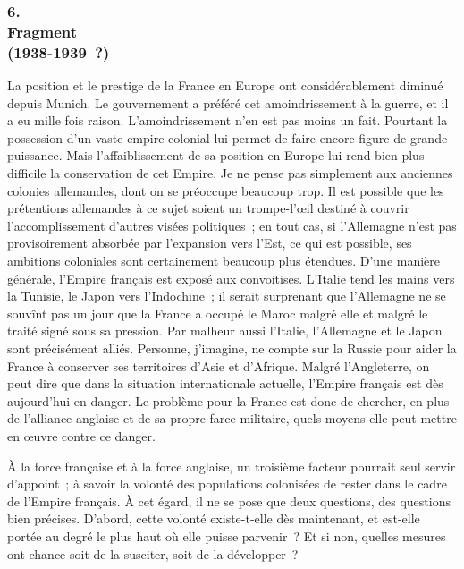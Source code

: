 \documentclass[french,twoside]{book} %
\begin{document}
\subsubsection[6. Fragment, (1938-1939 ?)]{6. \\
Fragment \\
(1938-1939 ?)}
\noindent \par
La position et le prestige de la France en Europe ont considérablement diminué depuis Munich. Le gouvernement a préféré cet amoindrissement à la guerre, et il a eu mille fois raison. L'amoindrissement n'en est pas moins un fait. Pourtant la possession d'un vaste empire colonial lui permet de faire encore figure de grande puissance. Mais l'affaiblissement de sa position en Europe lui rend bien plus difficile la conservation de cet Empire. Je ne pense pas simplement aux anciennes colonies allemandes, dont on se préoccupe beaucoup trop. Il est possible que les prétentions allemandes à ce sujet soient un trompe-l’œil destiné à couvrir l'accomplissement d'autres visées politi­ques ; en tout cas, si l'Allemagne n'est pas provisoirement absorbée par l'expansion vers l'Est, ce qui est possible, ses ambitions coloniales sont certai­nement beaucoup plus étendues. D'une manière générale, l'Empire français est exposé aux convoitises. L'Italie tend les mains vers la Tunisie, le Japon vers l'Indochine ; il serait surprenant que l'Allemagne ne se souvînt pas un jour que la France a occupé le Maroc malgré elle et malgré le traité signé sous sa pression. Par malheur aussi l'Italie, l'Allemagne et le Japon sont précisément alliés. Personne, j'imagine, ne compte sur la Russie pour aider la France à conserver ses territoires d'Asie et d'Afrique. Malgré l'Angleterre, on peut dire que dans la situation internationale actuelle, l'Empire français est dès aujour­d'hui en danger. Le problème pour la France est donc de chercher, en plus de l'alliance anglaise et de sa propre farce militaire, quels moyens elle peut mettre en œuvre contre ce danger.\par
À la force française et à la force anglaise, un troisième facteur pourrait seul servir d'appoint ; à savoir la volonté des populations colonisées de rester dans le cadre de l'Empire français. À cet égard, il ne se pose que deux questions, des questions bien précises. D'abord, cette volonté existe-t-elle dès maintenant, et est-elle portée au degré le plus haut où elle puisse parvenir ? Et si non, quelles mesures ont chance soit de la susciter, soit de la développer ?\par
\end{document}
